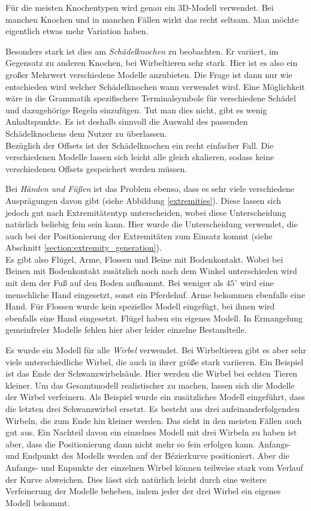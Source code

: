 Für die meisten Knochentypen wird genau ein 3D-Modell verwendet. Bei manchen Knochen und in manchen Fällen wirkt das recht seltsam. Man möchte eigentlich etwas mehr Variation haben.

Besonders stark ist dies am \emph{Schädelknochen} zu beobachten. Er variiert, im Gegensatz zu anderen Knochen, bei Wirbeltieren sehr stark. Hier ist es also ein großer Mehrwert verschiedene Modelle anzubieten. Die Frage ist dann nur wie entschieden wird welcher Schädelknochen wann verwendet wird. Eine Möglichkeit wäre in die Grammatik spezifischere Terminalsymbole für verschiedene Schädel und dazugehörige Regeln einzufügen. Tut man dies nicht, gibt es wenig Anhaltspunkte. Es ist deshalb sinnvoll die Auswahl des passenden Schädelknochens dem Nutzer zu überlassen.\\
Bezüglich der Offsets ist der Schädelknochen ein recht einfacher Fall. Die verschiedenen Modelle lassen sich leicht alle gleich skalieren, sodass keine verschiedenen Offsets gespeichert werden müssen.

Bei \emph{Händen und Füßen} ist das Problem ebenso, dass es sehr viele verschiedene Ausprägungen davon gibt (siehe \zb Abbildung \ref{extremities}). Diese lassen sich jedoch gut nach Extremitätentyp unterscheiden, wobei diese Unterscheidung natürlich beliebig fein sein kann. 
Hier wurde die Unterscheidung verwendet, die auch bei der Positionierung der Extremitäten zum Einsatz kommt (siehe Abschnitt \ref{section:extremity_generation}). \\
Es gibt also Flügel, Arme, Flossen und Beine mit Bodenkontakt. Wobei bei Beinen mit Bodenkontakt zusätzlich noch nach dem Winkel unterschieden wird mit dem der Fuß auf den Boden aufkommt. Bei weniger als $45^\circ$ wird eine menschliche Hand eingesetzt, sonst ein Pferdehuf. Arme bekommen ebenfalls eine Hand. Für Flossen wurde kein spezielles Modell eingefügt, bei ihnen wird ebenfalls eine Hand eingesetzt. Flügel haben ein eigenes Modell. In Ermangelung gemeinfreier Modelle fehlen hier aber leider einzelne Bestandteile.

Es wurde ein Modell für alle \emph{Wirbel} verwendet. Bei Wirbeltieren gibt es aber sehr viele unterschiedliche Wirbel, die auch in ihrer größe stark variieren. Ein Beispiel ist das Ende der Schwanzwirbelsäule. Hier werden die Wirbel bei echten Tieren kleiner.
Um das Gesamtmodell realistischer zu machen, lassen sich die Modelle der Wirbel verfeinern. Als Beispiel wurde ein zusätzliches Modell eingeführt, dass die letzten drei Schwanzwirbel ersetzt. Es besteht aus drei aufeinanderfolgenden Wirbeln, die zum Ende hin kleiner werden. Das sieht in den meisten Fällen auch gut aus. Ein Nachteil davon ein einzelnes Modell mit drei Wirbeln zu haben ist aber, dass die Positionierung dann nicht mehr so fein erfolgen kann. Anfangs- und Endpunkt des Modells werden auf der Bézierkurve positioniert. Aber die Anfangs- und Enpunkte der einzelnen Wirbel können teilweise stark vom Verlauf der Kurve abweichen.
Dies lässt sich natürlich leicht durch eine weitere Verfeinerung der Modelle beheben, indem jeder der drei Wirbel ein eigenes Modell bekommt.

